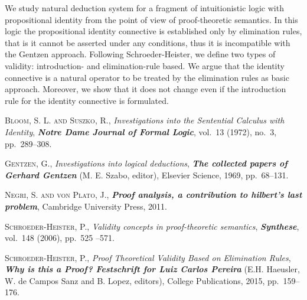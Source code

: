 \documentclass[bsl,meeting]{asl}
\newcommand{\NP}{}
\begin{document}
\thispagestyle{empty}


\NP  
{}



	We study natural deduction system for a fragment of intuitionistic logic with propositional identity from the point of view of proof-theoretic semantics. In this logic the propositional identity connective is established only by elimination rules, that is it cannot be asserted under any conditions, thus it is incompatible with the Gentzen approach. Following Schroeder-Heister, we define two types of validity: introduction- and elimination-rule based. We argue that the identity connective is a natural operator to be treated by the elimination rules as basic approach. Moreover, we show that it does not change even if the introduction rule for the identity connective is formulated. 


\begin{thebibliography}{10}

{\scshape Bloom, S. L. and Suszko, R.},
{\itshape Investigations into the {S}entential {C}alculus with {I}dentity},
{\bfseries\itshape Notre Dame Journal of Formal Logic},
vol.~13 (1972), no.~3, pp.~289--308.

{\scshape Gentzen, G.},
{\itshape Investigations into logical deductions},
{\bfseries\itshape The collected papers of Gerhard Gentzen}
(M. E. Szabo, editor),
Elsevier Science,
1969,
pp.~68--131.

{\scshape Negri, S. and  von Plato, J.},
{\bfseries\itshape Proof analysis, a contribution to hilbert’s last
problem},
Cambridge University Press,
2011.

{\scshape Schroeder-Heister, P.},
{\itshape Validity concepts in proof-theoretic semantics},
{\bfseries\itshape Synthese},
vol.~148 (2006), pp.~525 --571.


{\scshape Schroeder-Heister, P.},
{\itshape Proof Theoretical Validity Based on Elimination Rules},
{\bfseries\itshape Why is this a Proof? Festschrift for Luiz Carlos Pereira}
(E.H. Haeusler, W. de Campos Sanz and B. Lopez, editors),
College Publications,
2015,
pp.~159--176.


\end{thebibliography}


\vspace*{-0.5\baselineskip}
\end{document}
